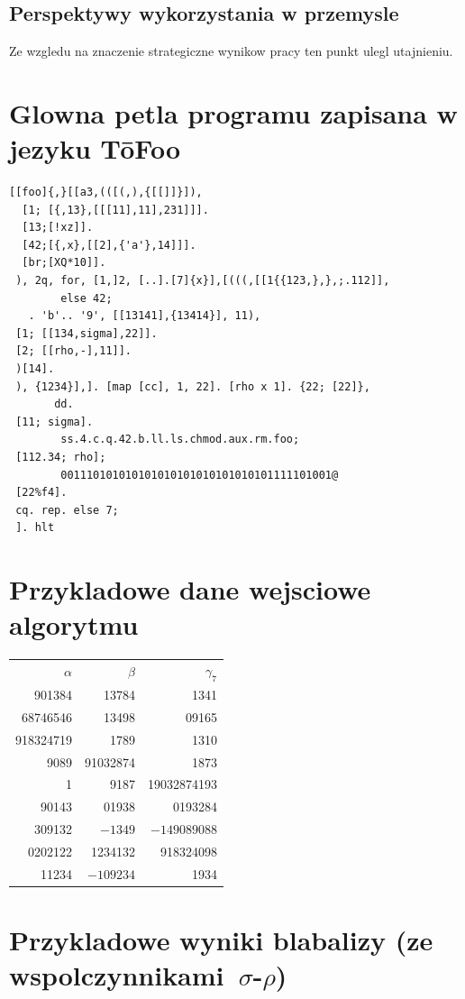 \documentclass{my_pracamgr}
\begin{document}
\section{Perspektywy wykorzystania w przemysle}

Ze wzgledu na znaczenie strategiczne wynikow pracy ten punkt ulegl
utajnieniu.

\appendix

\chapter{Glowna petla programu zapisana w jezyku T\=oFoo}

\begin{verbatim}
[[foo]{,}[[a3,(([(,),{[[]]}]),
  [1; [{,13},[[[11],11],231]]].
  [13;[!xz]].
  [42;[{,x},[[2],{'a'},14]]].
  [br;[XQ*10]].
 ), 2q, for, [1,]2, [..].[7]{x}],[(((,[[1{{123,},},;.112]],
        else 42;
   . 'b'.. '9', [[13141],{13414}], 11),
 [1; [[134,sigma],22]].
 [2; [[rho,-],11]].
 )[14].
 ), {1234}],]. [map [cc], 1, 22]. [rho x 1]. {22; [22]},
       dd.
 [11; sigma].
        ss.4.c.q.42.b.ll.ls.chmod.aux.rm.foo;
 [112.34; rho];
        001110101010101010101010101010101111101001@
 [22%f4].
 cq. rep. else 7;
 ]. hlt
\end{verbatim}

\chapter{Przykladowe dane wejsciowe algorytmu}

\begin{center}
  \begin{tabular}{rrr}
    $\alpha$ & $\beta$ & $\gamma_7$ \\
    901384 & 13784 & 1341\\
    68746546 & 13498& 09165\\
    918324719& 1789 & 1310 \\
    9089 & 91032874& 1873 \\
    1 & 9187 & 19032874193 \\
    90143 & 01938 & 0193284 \\
    309132 & $-1349$ & $-149089088$ \\
    0202122 & 1234132 & 918324098 \\
    11234 & $-109234$ & 1934 \\
  \end{tabular}
\end{center}

\chapter{Przykladowe wyniki blabalizy
    (ze wspolczynnikami~$\sigma$-$\rho$)}
\end{document}
